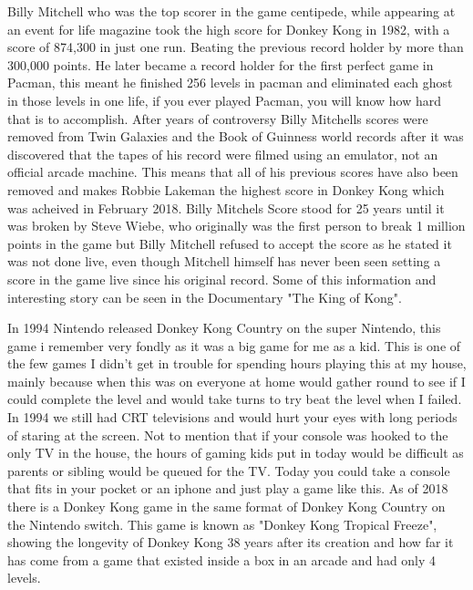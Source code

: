 \documentclass{article}
\begin{document}
 Billy Mitchell who was the top scorer in the game centipede, while appearing at an event for life magazine took the high score for Donkey Kong in 1982, with a score of 874,300 in just one run. Beating the previous record holder by more than 300,000 points. He later became a record holder for the first perfect game in Pacman, this meant he finished 256 levels in pacman and eliminated each ghost in those levels in one life, if you ever played Pacman, you will know how hard that is to accomplish. \newline \newline
After years of controversy Billy Mitchells scores were removed from Twin Galaxies and the Book of Guinness world records after it was discovered that the tapes of his record were filmed using an emulator, not an official arcade machine. This means that all of his previous scores have also been removed and makes Robbie Lakeman the highest score in Donkey Kong which was acheived in February 2018. Billy Mitchels Score stood for 25 years until it was broken by Steve Wiebe, who originally was the first person to break 1 million points in the game but Billy Mitchell refused to accept the score as he stated it was not done live, even though Mitchell himself has never been seen setting a score in the game live since his original record. Some of this information and interesting story can be seen in the Documentary "The King of Kong". \newline \newline

In 1994 Nintendo released Donkey Kong Country on the super Nintendo, this game i remember very fondly as it was a big game for me as a kid. This is one of the few games I didn't get in trouble for spending hours playing this at my house, mainly because when this was on everyone at home would gather round to see if I could complete the level and would take turns to try beat the level when I failed. In 1994 we still had CRT televisions and would hurt your eyes with long periods of staring at the screen. Not to mention that if your console was hooked to the only TV in the house, the hours of gaming kids put in today would be difficult as parents or sibling would be queued for the TV. Today you could take a console that fits in your pocket or an iphone and just play a game like this. As of 2018 there is a Donkey Kong game in the same format of Donkey Kong Country on the Nintendo switch. This game is known as "Donkey Kong Tropical Freeze", showing the longevity of Donkey Kong 38 years after its creation and how far it has come from a game that existed inside a box in an arcade and had only 4 levels.
\clearpage
\end{document}
